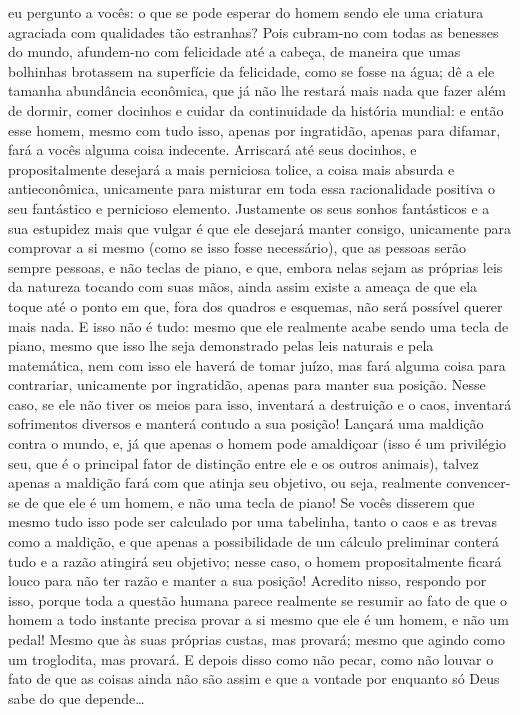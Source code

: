 eu pergunto a vocês: o que se pode esperar do homem sendo ele uma criatura
agraciada com qualidades tão estranhas? Pois cubram-no com todas as benesses do
mundo, afundem-no com felicidade até a cabeça, de maneira que umas bolhinhas
brotassem na superfície da felicidade, como se fosse na água; dê a ele tamanha
abundância econômica, que já não lhe restará mais nada que fazer além de
dormir, comer docinhos e cuidar da continuidade da história mundial: e então
esse homem, mesmo com tudo isso, apenas por ingratidão, apenas para difamar,
fará a vocês alguma coisa indecente. Arriscará até seus docinhos, e
propositalmente desejará a mais perniciosa tolice, a coisa mais absurda e
antieconômica, unicamente para misturar em toda essa racionalidade positiva o
seu fantástico e pernicioso elemento.  Justamente os seus sonhos fantásticos e
a sua estupidez mais que vulgar é que ele desejará manter consigo, unicamente
para comprovar a si mesmo (como se isso fosse necessário), que as pessoas serão
sempre pessoas, e não teclas de piano, e que, embora nelas sejam as próprias
leis da natureza tocando com suas mãos, ainda assim existe a ameaça de que ela
toque até o ponto em que, fora dos quadros e esquemas, não será possível querer
mais nada. E isso não é tudo: mesmo que ele realmente acabe sendo uma tecla de
piano, mesmo que isso lhe seja demonstrado pelas leis naturais e pela
matemática, nem com isso ele haverá de tomar juízo, mas fará alguma coisa
para contrariar, unicamente por ingratidão, apenas para manter sua posição.
Nesse caso, se ele não tiver os meios para isso, inventará a destruição e o
caos, inventará sofrimentos diversos e manterá contudo a sua posição! Lançará
uma maldição contra o mundo, e, já que apenas o homem pode amaldiçoar (isso é
um privilégio seu, que é o principal fator de distinção entre ele e os outros
animais), talvez apenas a maldição fará com que atinja seu objetivo, ou seja,
realmente convencer-se de que ele é um homem, e não uma tecla de piano! Se
vocês disserem que mesmo tudo isso pode ser calculado por uma tabelinha, tanto
o caos e as trevas como a maldição, e que apenas a possibilidade de um cálculo
preliminar conterá tudo e a razão atingirá seu objetivo; nesse caso, o homem
propositalmente ficará louco para não ter razão e manter a sua posição!
Acredito nisso, respondo por isso, porque toda a questão humana parece
realmente se resumir ao fato de que o homem a todo instante precisa provar a si
mesmo que ele é um homem, e não um pedal! Mesmo que às suas próprias custas,
mas provará; mesmo que agindo como um troglodita, mas provará.  E depois disso
como não pecar, como não louvar o fato de que as coisas ainda não são assim e
que a vontade por enquanto só Deus sabe do que depende\ldots{}

